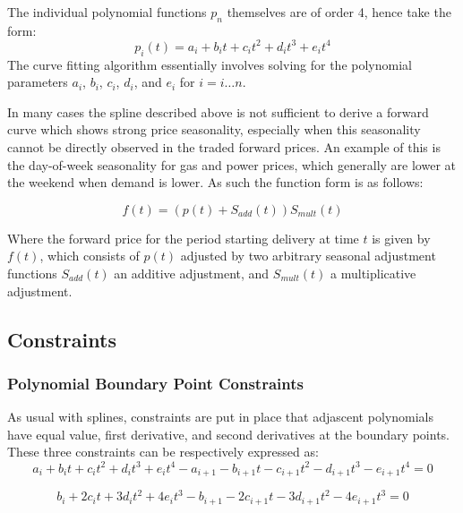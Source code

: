 \documentclass{article}
\begin{document}
\bigskip

The individual polynomial functions $p_n$ themselves are of order 4, hence take the form:
\begin{equation}
p_i(t) = a_i + b_i t + c_i t^2 + d_i t^3 + e_i t^4
\end{equation}
The curve fitting algorithm essentially involves solving for the polynomial parameters
$a_i$, $b_i$, $c_i$, $d_i$, and $e_i$ for $i=i \hdots n$.

\bigskip
In many cases the spline described above is not sufficient to derive a forward curve which
shows strong price seasonality, especially when this seasonality cannot be directly observed
in the traded forward prices. An example of this is the day-of-week seasonality for gas and
power prices, which generally are lower at the weekend when demand is lower. As such the 
function form is as follows:

\begin{equation}
    \label{eq:foward_function}
    f(t) = (p(t) + S_{add}(t))S_{mult}(t)
\end{equation}

Where the forward price for the period starting delivery at time $t$ is given by $f(t)$, which 
consists of $p(t)$ adjusted by two arbitrary seasonal adjustment functions
$S_{add}(t)$ an additive adjustment, and $S_{mult}(t)$ a multiplicative adjustment.


\subsection{Constraints}
\subsubsection{Polynomial Boundary Point Constraints}
As usual with splines, constraints are put in place that adjascent polynomials have equal value, first derivative, and second derivatives at the boundary points.
These three constraints can be respectively expressed as:
\begin{equation}
    \label{eq:continuity_constraint}
    a_i + b_i t + c_i t^2 + d_i t^3 + e_i t^4 - 
    a_{i+1} - b_{i+1} t - c_{i+1} t^2 - d_{i+1} t^3 - e_{i+1} t^4 = 0
\end{equation}

\begin{equation}
    \label{eq:1st_deriv_constraint}
    b_i + 2 c_i t + 3 d_i t^2 + 4 e_i t^3 - 
    b_{i+1} - 2 c_{i+1} t - 3 d_{i+1} t^2 - 4 e_{i+1} t^3 = 0
\end{equation}
\end{document}
